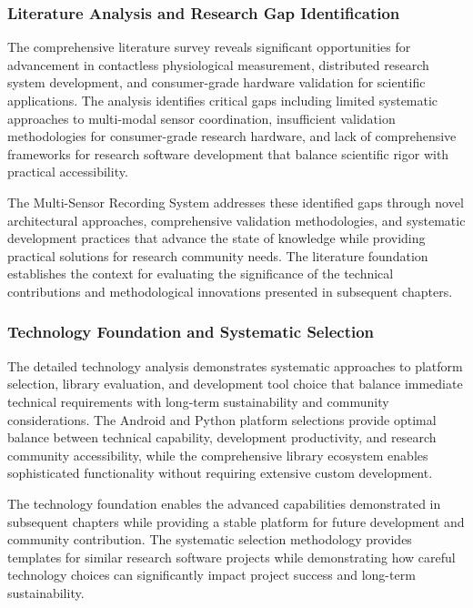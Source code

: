 \documentclass[12pt,a4paper]{article}
\begin{document}
\subsubsection{Literature Analysis and Research Gap Identification}

The comprehensive literature survey reveals significant opportunities for advancement in contactless physiological
measurement, distributed research system development, and consumer-grade hardware validation for scientific
applications. The analysis identifies critical gaps including limited systematic approaches to multi-modal sensor
coordination, insufficient validation methodologies for consumer-grade research hardware, and lack of comprehensive
frameworks for research software development that balance scientific rigor with practical accessibility.

The Multi-Sensor Recording System addresses these identified gaps through novel architectural approaches, comprehensive
validation methodologies, and systematic development practices that advance the state of knowledge while providing
practical solutions for research community needs. The literature foundation establishes the context for evaluating the
significance of the technical contributions and methodological innovations presented in subsequent chapters.

\subsubsection{Technology Foundation and Systematic Selection}

The detailed technology analysis demonstrates systematic approaches to platform selection, library evaluation, and
development tool choice that balance immediate technical requirements with long-term sustainability and community
considerations. The Android and Python platform selections provide optimal balance between technical capability,
development productivity, and research community accessibility, while the comprehensive library ecosystem enables
sophisticated functionality without requiring extensive custom development.

The technology foundation enables the advanced capabilities demonstrated in subsequent chapters while providing a stable
platform for future development and community contribution. The systematic selection methodology provides templates for
similar research software projects while demonstrating how careful technology choices can significantly impact project
success and long-term sustainability.
\end{document}
